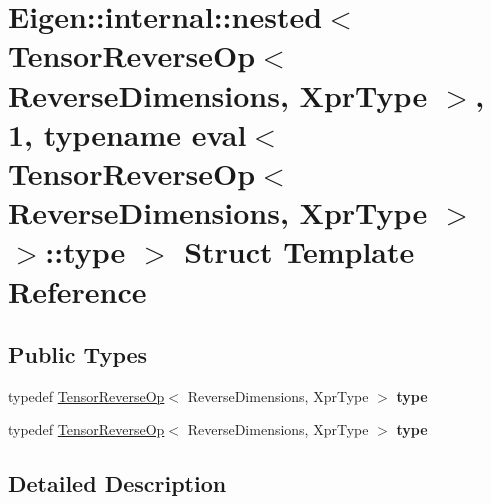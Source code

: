 \hypertarget{struct_eigen_1_1internal_1_1nested_3_01_tensor_reverse_op_3_01_reverse_dimensions_00_01_xpr_type056f008193b03fc2e20fd2a6d2e9a44a}{}\section{Eigen\+:\+:internal\+:\+:nested$<$ Tensor\+Reverse\+Op$<$ Reverse\+Dimensions, Xpr\+Type $>$, 1, typename eval$<$ Tensor\+Reverse\+Op$<$ Reverse\+Dimensions, Xpr\+Type $>$ $>$\+:\+:type $>$ Struct Template Reference}
\label{struct_eigen_1_1internal_1_1nested_3_01_tensor_reverse_op_3_01_reverse_dimensions_00_01_xpr_type056f008193b03fc2e20fd2a6d2e9a44a}
\subsection*{Public Types}
\begin{DoxyCompactItemize}
\item 
\mbox{\label{struct_eigen_1_1internal_1_1nested_3_01_tensor_reverse_op_3_01_reverse_dimensions_00_01_xpr_type056f008193b03fc2e20fd2a6d2e9a44a_aef9c6ae37dd69283ee61b4b4ca392e1b}} 
typedef \hyperlink{class_eigen_1_1_tensor_reverse_op}{Tensor\+Reverse\+Op}$<$ Reverse\+Dimensions, Xpr\+Type $>$ {\bfseries type}
\item 
\mbox{\label{struct_eigen_1_1internal_1_1nested_3_01_tensor_reverse_op_3_01_reverse_dimensions_00_01_xpr_type056f008193b03fc2e20fd2a6d2e9a44a_aef9c6ae37dd69283ee61b4b4ca392e1b}} 
typedef \hyperlink{class_eigen_1_1_tensor_reverse_op}{Tensor\+Reverse\+Op}$<$ Reverse\+Dimensions, Xpr\+Type $>$ {\bfseries type}
\end{DoxyCompactItemize}


\subsection{Detailed Description}
